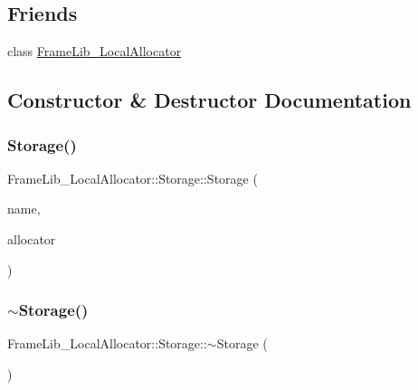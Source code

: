 \subsection*{Friends}
\begin{DoxyCompactItemize}
\item 
class \hyperlink{class_frame_lib___local_allocator_1_1_storage_ab38ae86a5b2f6f2e79c8b7ed2a9c8c20}{Frame\+Lib\+\_\+\+Local\+Allocator}
\end{DoxyCompactItemize}


\subsection{Constructor \& Destructor Documentation}
\mbox{\label{class_frame_lib___local_allocator_1_1_storage_a51742c2b24393570cf3478d0ad7530f8}} 
\subsubsection{\texorpdfstring{Storage()}{Storage()}}
{\footnotesize\ttfamily Frame\+Lib\+\_\+\+Local\+Allocator\+::\+Storage\+::\+Storage (\begin{DoxyParamCaption}\item[{const char $\ast$}]{name,  }\item[{\hyperlink{class_frame_lib___local_allocator}{Frame\+Lib\+\_\+\+Local\+Allocator} $\ast$}]{allocator }\end{DoxyParamCaption})\hspace{0.3cm}{\ttfamily [protected]}}

\mbox{\label{class_frame_lib___local_allocator_1_1_storage_a562e98ee56a7fcff07f90621572688b1}} 
\subsubsection{\texorpdfstring{$\sim$\+Storage()}{~Storage()}}
{\footnotesize\ttfamily Frame\+Lib\+\_\+\+Local\+Allocator\+::\+Storage\+::$\sim$\+Storage (\begin{DoxyParamCaption}{ }\end{DoxyParamCaption})\hspace{0.3cm}{\ttfamily [protected]}}




